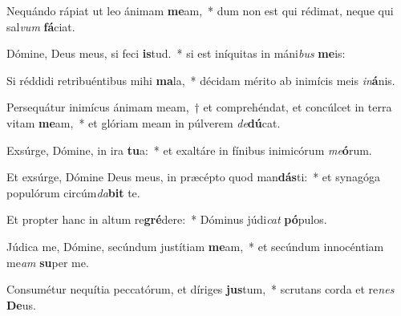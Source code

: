 \item Nequándo rápiat ut leo ánimam \textbf{me}am,~* dum non est qui rédimat, neque qui sal\textit{vum} \textbf{fá}ciat.
\item Dómine, Deus meus, si feci \textbf{is}tud.~* si est iníquitas in máni\textit{bus} \textbf{me}is:
\item Si réddidi retribuéntibus mihi \textbf{ma}la,~* décidam mérito ab inimícis meis \textit{in}\textbf{á}nis.
\item Persequátur inimícus ánimam meam,~† et comprehéndat, et concúlcet in terra vitam \textbf{me}am,~* et glóriam meam in púlverem \textit{de}\textbf{dú}cat.
\item Exsúrge, Dómine, in ira \textbf{tu}a:~* et exaltáre in fínibus inimicórum \textit{me}\textbf{ó}rum.
\item Et exsúrge, Dómine Deus meus, in præcépto quod man\textbf{dás}ti:~* et synagóga populórum circúm\textit{da}\textbf{bit} te.
\item Et propter hanc in altum re\textbf{gré}dere:~* Dóminus júdi\textit{cat} \textbf{pó}pulos.
\item Júdica me, Dómine, secúndum justítiam \textbf{me}am,~* et secúndum innocéntiam me\textit{am} \textbf{su}per me.
\item Consumétur nequítia peccatórum, et díriges \textbf{jus}tum,~* scrutans corda et re\textit{nes} \textbf{De}us.
